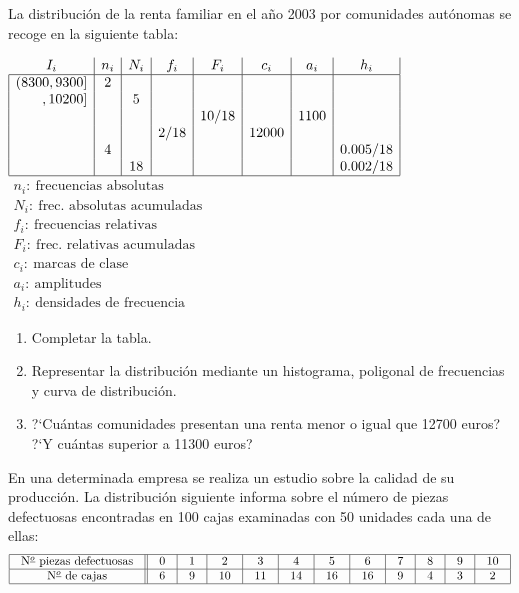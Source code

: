 \documentclass[hidequestions]{homework}
\begin{document}
	\color{black}
	
	
	
	
	\problem
	La distribuci{\'o}n de la renta familiar  en el a{\~n}o 2003 por comunidades aut{\'o}nomas se recoge en la
	siguiente tabla:
	
	$\begin{array}{|r|c|c|c|c|c|c|c|}
	\multicolumn{1}{c|}{I_{i}} & n_{i} & N_{i} & f_{i} & F_{i} & c_{i} & a_{i} & h_{i} \\
	\hline
	(8300,9300] & 2 &  &  &  &  &  &  \\
	,10200] &  & 5 &  &  &  &  &  \\
	&  &  &  & 10/18 &  & 1100 &  \\
	&  &  & 2/18 &  & 12000 &  &  \\
	& 4 &  &  &  &  &  & 0\mbox{.}005/18 \\
	&  & 18 &  &  &  &  & 0\mbox{.}002/18 \\  \hline
	\end{array}$ \hskip 1cm $\begin{array}{l}  n_i: \ \mbox{frecuencias absolutas} \\ N_i:  \ \mbox{frec. absolutas acumuladas}\\ f_i:  \ \mbox{frecuencias relativas}
	\\ F_i:  \ \mbox{frec. relativas acumuladas}\\ c_i:  \ \mbox{marcas de clase}\\ a_i:  \ \mbox{amplitudes} \\ h_i:  \ \mbox{densidades de frecuencia}\end{array}$
	\begin{enumerate}
		\item Completar la tabla.
		\item Representar la distribuci{\'o}n mediante un histograma,
		poligonal de frecuencias y curva de distribuci{\'o}n.
		\item ?`Cu{\'a}ntas comunidades presentan una renta menor o igual
		que 12700 euros? ?`Y cu{\'a}ntas superior a 11300 euros? \\
	\end{enumerate}
	
	\color{black}
	
	
	
	
	\problem
	En una determinada empresa se realiza un estudio sobre la calidad de su
	producci{\'o}n. La distribuci{\'o}n siguiente informa sobre el n{\'u}mero de  piezas
	defectuosas encontradas en 100 cajas examinadas con 50 unidades cada una
	de ellas:
	$$\setlength{\arraycolsep}{10pt}
	\begin{array}{|c||c|c|c|c|c|c|c|c|c|c|c|} \hline
	\mbox{N${}^{\underline{o}}$ piezas defectuosas} & 0 & 1 & 2  & 3
	& 4  & 5  & 6  & 7 & 8 & 9 & 10 \\ \hline
	\mbox{N${}^{\underline{o}}$ de cajas}           & 6 & 9 & 10 & 11
	& 14 & 16 & 16 & 9 & 4 & 3 & 2 \\ \hline
	\end{array}
	$$
	
\end{document}
